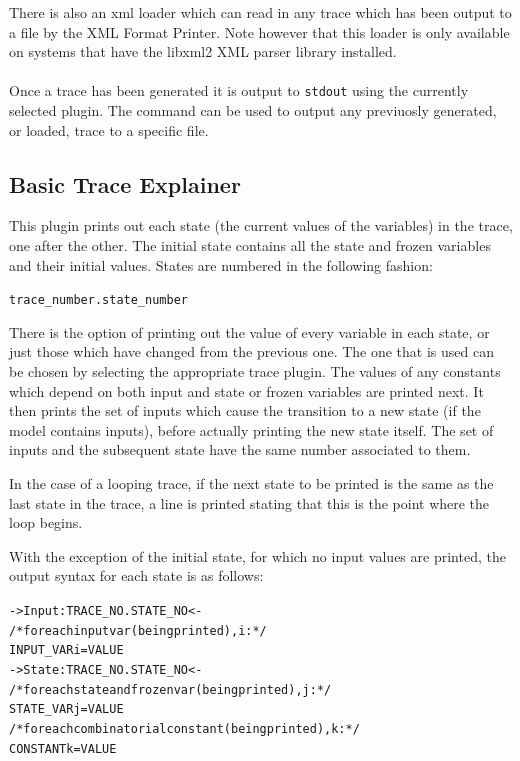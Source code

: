 There is also an xml loader which can read in any trace which has been
output to a file by the XML Format Printer. Note however that this
loader is only available on systems that have the libxml2 XML parser
library installed.\\
\\
Once a trace has been generated it is output to \texttt{stdout} using
the currently selected plugin. The command  can
be used to output any previuosly generated, or loaded, trace to a
specific file.

\subsection{Basic Trace Explainer}
\label{Basic Trace Explainer}

This plugin prints out each state (the current values of the
variables) in the trace, one after the other. The initial state
contains all the state and frozen variables and their initial
values. States are numbered in the following fashion:

\begin{center}
\texttt{trace\_number.state\_number}
\end{center}

There is the option of printing out the value of every variable in
each state, or just those which have changed from the previous
one. The one that is used can be chosen by selecting the appropriate
trace plugin. The values of any constants which depend on both input
and state or frozen variables are printed next. It then prints the set of inputs
which cause the transition to a new state (if the model contains
inputs), before actually printing the new state itself. The set of
inputs and the subsequent state have the same number associated to
them.

In the case of a looping trace, if the next state to be printed is the
same as the last state in the trace, a line is printed stating that
this is the point where the loop begins.

With the exception of the initial state, for which no input values are
printed, the output syntax for each state is as follows:

\begin{alltt}
-> Input: TRACE_NO.STATE_NO <-
    /* for each input var (being printed), i: */
    INPUT_VARi = VALUE
-> State: TRACE_NO.STATE_NO <-
    /* for each state and frozen var (being printed), j: */
    STATE_VARj = VALUE
    /* for each combinatorial constant (being printed), k: */
    CONSTANTk = VALUE
\end{alltt}

